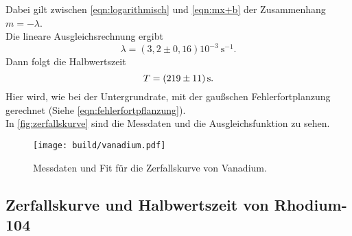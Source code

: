 Dabei gilt zwischen \autoref{eqn:logarithmisch} und \autoref{eqn:mx+b} der 
Zusammenhang $m = -\lambda$.
\\
Die lineare Ausgleichsrechnung ergibt
\begin{equation}
	\lambda = (3,2 \pm 0,16) 10^{-3} \  \si{\second}^{-1}.
\end{equation}
\noindent Dann folgt die Halbwertszeit
\begin{equation}
	T = \SI{219\pm11}{\second}.
\end{equation}
Hier wird, wie bei der Untergrundrate, mit der gaußschen Fehlerfortplanzung gerechnet (Siehe 
\autoref{eqn:fehlerfortpflanzung}).
\\
In \autoref{fig:zerfallskurve} sind die Messdaten und die Ausgleichsfunktion zu sehen.

\begin{figure}[H]
	\centering
	\texttt{[image: build/vanadium.pdf]}
	\caption{Messdaten und Fit für die Zerfallskurve von Vanadium.}
	\label{fig:zerfallskurve}
\end{figure}


\subsection{Zerfallskurve und Halbwertszeit von Rhodium-104}
\label{sec:aus:rhodium}

